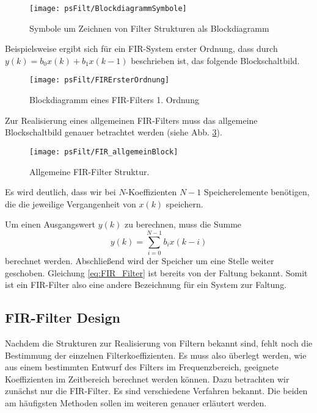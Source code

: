 \begin{figure}[H]
\begin{center}
\texttt{[image: psFilt/BlockdiagrammSymbole]}
\caption{\label{pic:BlockDiagramSymbols}Symbole um Zeichnen von
Filter  Strukturen als Blockdiagramm}
\end{center}
\end{figure}

Beispielsweise ergibt sich für ein FIR-System erster Ordnung, dass
durch $y(k) = b_0 x(k) + b_1 x(k-1)$ beschrieben ist, das folgende
Blockschaltbild.
\begin{figure}[H]
\begin{center}
\texttt{[image: psFilt/FIRErsterOrdnung]}
\caption{\label{pic:FIRErsterOrdnung}Blockdiagramm eines
FIR-Filters 1. Ordnung}
\end{center}
\end{figure}

Zur Realisierung eines allgemeinen FIR-Filters muss das allgemeine
Blockschaltbild genauer betrachtet werden (siehe Abb. \ref{pic:FIR_Blockdiagramm}).
\begin{figure}[H]
\begin{center}
\texttt{[image: psFilt/FIR\_allgemeinBlock]}
\caption{\label{pic:FIR_Blockdiagramm}Allgemeine FIR-Filter Struktur.}
\end{center}
\end{figure}

Es wird deutlich, dass wir bei $N$-Koeffizienten $N-1$
Speicherelemente benötigen, die die jeweilige Vergangenheit von
$x(k)$ speichern.

Um einen Ausgangswert $y(k)$ zu berechnen, muss die Summe
\begin{equation}\label{eq:FIR_Filter}
    y(k) = \sum_{i = 0}^{N-1} b_i x(k-i)
\end{equation}
berechnet werden. Abschließend wird der Speicher um eine Stelle
weiter geschoben. Gleichung \ref{eq:FIR_Filter} ist bereits von
der Faltung bekannt. Somit ist ein FIR-Filter also eine andere
Bezeichnung für ein System zur Faltung.

\subsection{FIR-Filter Design}
Nachdem die Strukturen zur Realisierung von Filtern bekannt sind, fehlt noch die Bestimmung
der einzelnen Filterkoeffizienten. Es muss also überlegt werden, wie aus einem bestimmten Entwurf
des Filters im Frequenzbereich, geeignete Koeffizienten im Zeitbereich berechnet werden können. Dazu betrachten
wir zunächst nur die FIR-Filter. Es sind verschiedene Verfahren bekannt. Die beiden am häufigsten
Methoden sollen im weiteren genauer erläutert werden.


